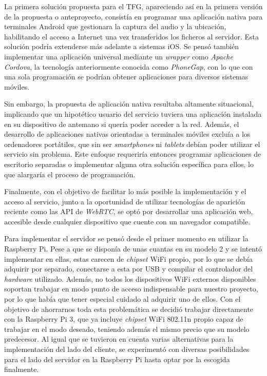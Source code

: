 \begin{appendices}
La primera solución propuesta para el TFG, apareciendo así en la primera versión de la propuesta o anteproyecto, consistía en programar una aplicación nativa para terminales Android que gestionara la captura del audio y la ubicación, habilitando el acceso a Internet una vez transferidos los ficheros al servidor. Esta solución podría extenderse más adelante a sistemas iOS. Se pensó también implementar una aplicación universal mediante un \emph{wrapper} como \emph{Apache Cordova}, la tecnología anteriormente conocida como \emph{PhoneGap}, con lo que con una sola programación se podrían obtener aplicaciones para diversos sistemas móviles.

Sin embargo, la propuesta de aplicación nativa resultaba altamente situacional, implicando que un hipotético usuario del servicio tuviera una aplicación instalada en su dispositivo de antemano si quería poder acceder a la red. Además, el desarrollo de aplicaciones nativas orientadas a terminales móviles excluía a los ordenadores portátiles, que sin ser \emph{smartphones} ni \emph{tablets} debían poder utilizar el servicio sin problema. Este enfoque requeriría entonces programar aplicaciones de escritorio separadas o implementar alguna otra solución específica para ellos, lo que alargaría el proceso de programación.

Finalmente, con el objetivo de facilitar lo más posible la implementación y el acceso al servicio, junto a la oportunidad de utilizar tecnologías de aparición reciente como las API de \emph{WebRTC}, se optó por desarrollar una aplicación web, accesible desde cualquier dispositivo que cuente con un navegador compatible.

Para implementar el servidor se pensó desde el primer momento en utilizar la Raspberry Pi. Pese a que se disponía de unas cuantas en su modelo 2 y se intentó implementar en ellas, estas carecen de \emph{chipset} WiFi propio, por lo que se debía adquirir por separado, conectarse a esta por USB y compilar el controlador del \emph{hardware} utilizado. Además, no todos los dispositivos WiFi externos disponibles soportan trabajar en modo punto de acceso indispensable para nuestro proyecto, por lo que había que tener especial cuidado al adquirir uno de ellos. Con el objetivo de ahorrarnos toda esta problemática se decidió trabajar directamente con la Raspberry Pi 3, que ya incluye \emph{chipset} WiFi 802.11n propio capaz de trabajar en el modo deseado, teniendo además el mismo precio que su modelo predecesor. Al igual que se tuvieron en cuenta varias alternativas para la implementación del lado del cliente, se experimentó con diversas posibilidades para el lado del servidor en la Raspberry Pi hasta optar por la escogida finalmente.


\end{appendices}
